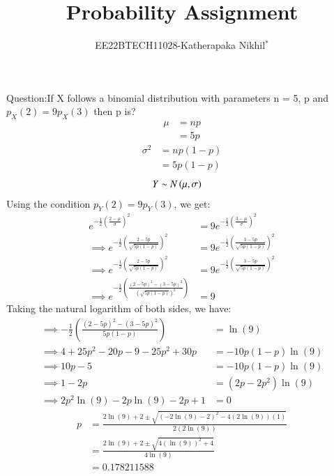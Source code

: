 \documentclass[journal,12pt,twocolumn]{IEEEtran}
\theoremstyle{remark}
\begin{document}

\vspace{3cm}

\title{Probability Assignment}
\author{EE22BTECH11028-Katherapaka Nikhil$^{*}$%
}
\maketitle
\newpage
\bigskip
\renewcommand{\thefigure}{\theenumi}
\renewcommand{\thetable}{\theenumi}

Question:If X follows a binomial distribution with parameters n = 5, p and
$p_X(2) = 9p_X(3)$
then p is?\\
\solution
\begin{align}
\mu&=np\\
&=5p
\end{align}
\begin{align}
\sigma^2&=np(1-p)\\
&=5p(1-p)
\end{align}
\begin{align}
	Y &\sim N\left(\mu,\sigma\right)
\end{align}
Using the condition \(p_Y(2) = 9p_Y(3)\), we get:
\begin{align}
e^{-\frac{1}{2}(\frac{2-\mu}{\sigma})^2} &= 9 e^{-\frac{1}{2}\left(\frac{3-\mu}{\sigma}\right)^2} \\
\implies e^{-\frac{1}{2}\left(\frac{2 -  5p}{\sqrt{5p(1-p)}}\right)^2} &= 9 e^{-\frac{1}{2}\left(\frac{3 - 5p}{\sqrt{5p(1-p)}}\right)^2} \\
\implies e^{-\frac{1}{2}\left(\frac{2 - 5p}{\sqrt{5p(1-p)}}\right)^2} &= 9 e^{-\frac{1}{2}\left(\frac{3 - 5p}{\sqrt{5p(1-p)}}\right)^2} \\
\implies e^{-\frac{1}{2}\left(\frac{(2 - 5p)^2-(3 - 5p)^2}{(\sqrt{5p(1-p)})^2}\right)}&=9
\end{align}
Taking the natural logarithm of both sides, we have:
\begin{align}
\implies -\frac{1}{2}\left(\frac{(2 - 5p)^2-(3 - 5p)^2}{5p(1-p)}\right) &= \ln(9) \\
\implies 4+25p^2-20p-9-25p^2+30p &= -10p(1-p) \ln(9) \\
\implies 10p-5 &= -10p(1-p) \ln(9) \\
\implies 1-2p &= (2p-2p^2) \ln(9) \\
\implies 2p^2\ln(9) - 2p\ln(9) - 2p + 1 &= 0 
\end{align}
\begin{align}
p &= \frac{2\ln(9) + 2 \pm \sqrt{(-2\ln(9) - 2)^2 - 4(2\ln(9))(1)}}{2(2\ln(9))} \\
 &= \frac{2\ln(9) + 2 \pm \sqrt{4(\ln(9))^2 +4}}{4\ln(9)}\\
&=0.178211588
\end{align}
\end{document}
